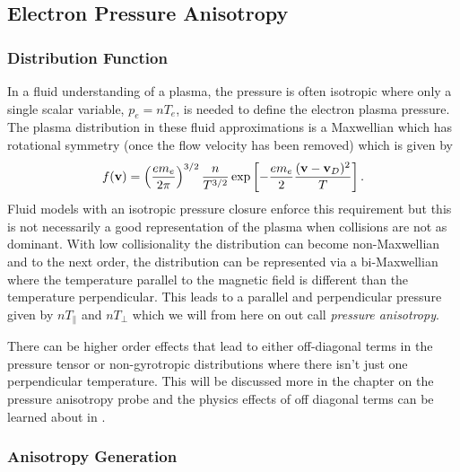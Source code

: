 

\subsection{Electron Pressure Anisotropy}

\subsubsection{Distribution Function}
\label{ss2:intro_PA_what}

In a fluid understanding of a plasma, the pressure is often isotropic where only a single scalar variable, $p_e = nT_e$, is needed to define the electron plasma pressure. The plasma distribution in these fluid approximations is a Maxwellian which has rotational symmetry (once the flow velocity has been removed) which is given by
\begin{equation}
  f(\vb{v}) = \left(\frac{e m_e}{2 \pi}\right)^{3/2} \frac{n}{T^{3/2}} \exp \left[-\frac{e m_e}{2} \frac{(\vb{v} - \vb{v}_D)^2}{T}\right].
  \label{eq:maxwellian_distribution}
\end{equation}
Fluid models with an isotropic pressure closure enforce this requirement but this is not necessarily a good representation of the plasma when collisions are not as dominant. With low collisionality the distribution can become non-Maxwellian and to the next order, the distribution can be represented via a bi-Maxwellian where the temperature parallel to the magnetic field is different than the temperature perpendicular. This leads to a parallel and perpendicular pressure given by $n T_\parallel$ and $n T_\perp$ which we will from here on out call \textit{pressure anisotropy}.

There can be higher order effects that lead to either off-diagonal terms in the pressure tensor or non-gyrotropic distributions where there isn't just one perpendicular temperature. This will be discussed more in the chapter on the pressure anisotropy probe and the physics effects of off diagonal terms can be learned about in \cite{Egedal_2023}.

\subsubsection{Anisotropy Generation}
\label{ss2:intro_PA_generation}

